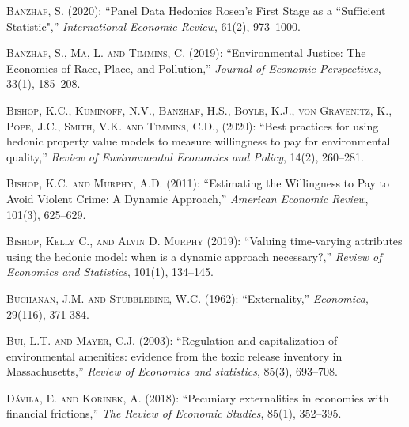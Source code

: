 \documentclass[ecta,nameyear,draft]{econsocart}
\theoremstyle{plain}
\theoremstyle{remark}
\begin{document}
\begin{thebibliography}{}
%


\textsc{Banzhaf, S.} (2020):
``Panel Data Hedonics Rosen’s First Stage as a “Sufficient
Statistic",''
\textit{International Economic Review}, 61(2), 973--1000.
\endbibitem


\textsc{Banzhaf, S., Ma, L. and Timmins, C.} (2019):
``Environmental Justice: The Economics of Race, Place, and Pollution,''
\textit{Journal of Economic Perspectives}, 33(1), 185--208.
\endbibitem

\textsc{Bishop, K.C., Kuminoff, N.V., Banzhaf, H.S., Boyle, K.J., von Gravenitz, K., Pope, J.C., Smith, V.K. and Timmins, C.D., } (2020):
``Best practices for using hedonic property value models to measure willingness to pay for environmental quality,''
\textit{Review of Environmental Economics and Policy}, 14(2), 260--281.
\endbibitem

\textsc{Bishop, K.C. and Murphy, A.D.} (2011):
``Estimating the Willingness to Pay to Avoid Violent Crime: A Dynamic Approach,''
\textit{American Economic Review}, 101(3), 625--629.
\endbibitem

\textsc{Bishop, Kelly C., and Alvin D. Murphy} (2019):
``Valuing time-varying attributes using the hedonic model: when is a dynamic approach necessary?,''
\textit{Review of Economics and Statistics}, 101(1), 134--145.
\endbibitem

\textsc{Buchanan, J.M. and Stubblebine, W.C.} (1962):
``Externality,''
\textit{Economica}, 29(116), 371-384.
\endbibitem

\textsc{Bui, L.T. and Mayer, C.J.} (2003):
``Regulation and capitalization of environmental amenities: evidence from the toxic release inventory in Massachusetts,''
\textit{Review of Economics and statistics}, 85(3), 693--708.
\endbibitem

 
\textsc{Dávila, E. and Korinek, A.} (2018):
``Pecuniary externalities in economies with financial frictions,''
\textit{The Review of Economic Studies}, 85(1), 352--395.
\endbibitem



\end{thebibliography}
\end{document}

